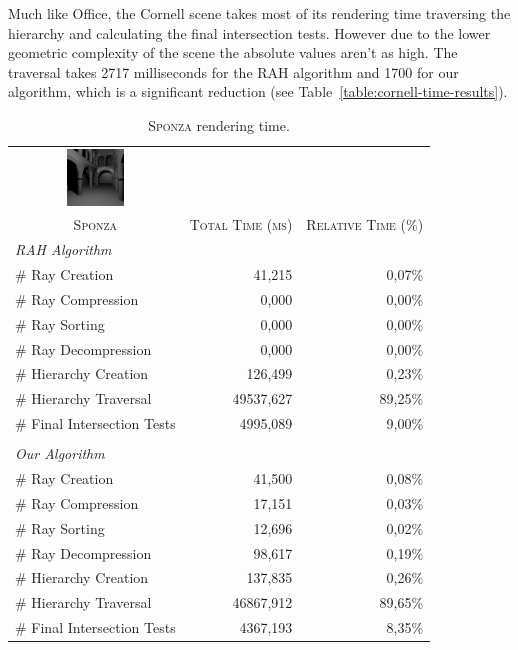 \documentclass{egpubl}
\begin{document}
Much like Office, the Cornell scene takes most of its rendering time traversing the hierarchy and calculating the final intersection tests. However due to the lower geometric complexity of the scene the absolute values aren't as high. The traversal takes 2717 milliseconds for the RAH algorithm and 1700 for our algorithm, which is a significant reduction (see Table~\ref{table:cornell-time-results}).

\begin{table}[!htb]
\begin{center}
\fontsize{7}{9}
\selectfont
\begin{tabular}{l|rr}
    \multicolumn{1}{c}{\includegraphics[width=1.5cm]{Images/Sponza_Preview}} & & \\
    \multicolumn{1}{c|}{\textsc{Sponza}} & \textsc{Total Time (ms)} & \textsc{Relative Time (\%)}\\
    \hline
    \emph{RAH Algorithm} & & \\
    \hline
    \quad \# Ray Creation               & 41,215	& 0,07\%	\\
    \quad \# Ray Compression            & 0,000     & 0,00\%	\\
    \quad \# Ray Sorting                & 0,000	    & 0,00\%    \\
    \quad \# Ray Decompression          & 0,000	    & 0,00\%    \\
    \quad \# Hierarchy Creation         & 126,499	& 0,23\%    \\
    \quad \# Hierarchy Traversal        & 49537,627	& 89,25\%   \\
    \quad \# Final Intersection Tests   & 4995,089	& 9,00\%	\\
    & & \\
    \hline
    \emph{Our Algorithm} & & \\
    \hline
    \quad \# Ray Creation               & 41,500	& 0,08\%	\\
    \quad \# Ray Compression            & 17,151    & 0,03\%	\\
    \quad \# Ray Sorting                & 12,696	& 0,02\%    \\
    \quad \# Ray Decompression          & 98,617	& 0,19\%    \\
    \quad \# Hierarchy Creation         & 137,835	& 0,26\%    \\
    \quad \# Hierarchy Traversal        & 46867,912	& 89,65\%   \\
    \quad \# Final Intersection Tests   & 4367,193	& 8,35\%	\\
\end{tabular}
\end{center}
\caption{\label{table:sponza-time-results}
\textsc{Sponza} rendering time.}
\end{table}
\end{document}
